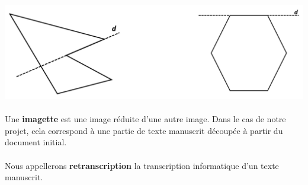 \paragraph{}
\begin{mdframed}[frametitle={Figure 1 : Exemples de polygones concave (à gauche) et convexe (à droite)}, innerbottommargin=10]
\begin{center}
\includegraphics[width=\linewidth]{polygone.png}
\end{center}
\end{mdframed}

\paragraph{}
Une \textbf{imagette} est une image réduite d'une autre image. Dans le cas de notre projet,
cela correspond à une partie de texte manuscrit découpée à partir du document initial.

\paragraph{}
Nous appellerons \textbf{retranscription} la transcription informatique d’un texte manuscrit.